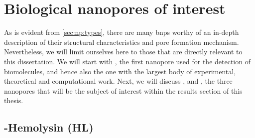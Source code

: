 %
%
\section{Biological nanopores of interest}
%
\label{sec:np:interest}

As is evident from \cref{sec:np:types}, there are many \glspl{bnp} worthy of an in-depth description of their
structural characteristics and pore formation mechanism. Nevertheless, we will limit ourselves here to those
that are directly relevant to this dissertation. We will start with , the first nanopore used
for the detection of biomolecules, and hence also the one with the largest body of experimental, theoretical
and computational work. Next, we will discuss ,  and , the three
nanopores that will be the subject of interest within the results section of this thesis.


\subsection[Alpha-Hemolysin (aHL)]{\ta-Hemolysin (\ta{}HL)}
%
\label{sec:np:ahl}
%


